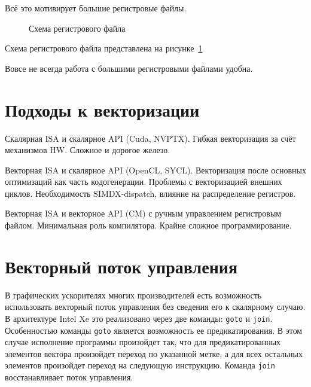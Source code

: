 Всё это мотивирует большие регистровые файлы.

\begin{figure}[ht]
    \caption{Схема регистрового файла}\label{fig:genisa-addressing-base}
\end{figure}

Схема регистрового файла представлена на рисунке~\cref{fig:genisa-addressing-base}

Вовсе не всегда работа с большими регистровыми файлами удобна.

\section{Подходы к векторизации}\label{sec:overview/vectorizing}

Скалярная ISA и скалярное API (Cuda, NVPTX). Гибкая векторизация за счёт механизмов HW.
Сложное и дорогое железо.

Векторная ISA и скалярное API (OpenCL, SYCL). Векторизация после основных оптимизаций как часть кодогенерации.
Проблемы с векторизацией внешних циклов.
Необходимость SIMDX-dispatch, влияние на распределение регистров.

Векторная ISA и векторное API (CM) с ручным управлением регистровым файлом.
Минимальная роль компилятора.
Крайне сложное программирование.

\section{Векторный поток управления}\label{sec:overview/simdcf}

В графических ускорителях многих производителей есть возможность использовать векторный поток управления без сведения его к скалярному случаю. В архитектуре Intel Xe это реализовано через две команды: \texttt{goto} и \texttt{join}. Особенностью команды \texttt{goto} является возможность ее предикатирования. В этом случае исполнение программы произойдет так, что для предикатированных элементов вектора произойдет переход по указанной метке, а для всех остальных элементов произойдет переход на следующую инструкцию. Команда \texttt{join} восстанавливает поток управления.

